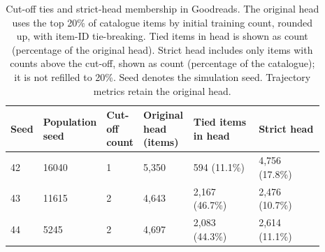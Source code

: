 \begin{table}[htbp!]
\centering
\small
\setlength{\tabcolsep}{3pt}
\renewcommand{\arraystretch}{1.1}
\begin{tabular}{p{0.07\linewidth}p{0.14\linewidth}p{0.10\linewidth}p{0.16\linewidth}p{0.21\linewidth}p{0.21\linewidth}}
\hline
Seed & Population seed & Cut-off count & Original head (items) & Tied items in head & Strict head \\
\hline
42 & 16040 & 1 & 5,350 & 594 (11.1\%) & 4,756 (17.8\%) \\
43 & 11615 & 2 & 4,643 & 2,167 (46.7\%) & 2,476 (10.7\%) \\
44 & 5245 & 2 & 4,697 & 2,083 (44.3\%) & 2,614 (11.1\%) \\
\hline
\end{tabular}
\caption{Cut-off ties and strict-head membership in Goodreads. The original head uses the top 20\% of catalogue items by initial training count, rounded up, with item-ID tie-breaking. Tied items in head is shown as count (percentage of the original head). Strict head includes only items with counts above the cut-off, shown as count (percentage of the catalogue); it is not refilled to 20\%. Seed denotes the simulation seed. Trajectory metrics retain the original head.}
\label{chap:results:tab:rq6_goodreads_head_cutoff_ties}
\end{table}
